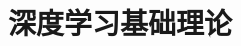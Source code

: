 \setcounter{chapter}{0}

\hypertarget{ux6df1ux5ea6ux5b66ux4e60ux57faux7840ux7406ux8bba}{%
\chapter{深度学习基础理论}\label{ux6df1ux5ea6ux5b66ux4e60ux57faux7840ux7406ux8bba}}
